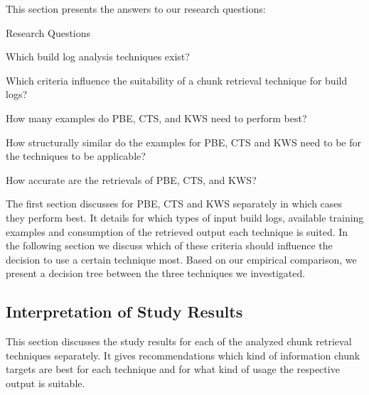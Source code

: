 This section presents the answers to our research questions:
\begin{simplebox}{Research Questions}
\begin{itemize}
  \item[\textbf{RQ1:}] Which build log analysis techniques exist?
  \item[\textbf{RQ2:}] Which criteria influence the suitability of a
  chunk retrieval technique for build logs?

  {\small \item[\textbf{~~ RQ2.1:}] How many examples do PBE, CTS,
  and KWS need to perform best?
  \item[\textbf{~~ RQ2.2:}] How structurally similar do the examples
  for PBE, CTS and KWS need to be for the techniques to be applicable?
  \item[\textbf{~~ RQ2.3:}] How accurate are the retrievals of PBE, CTS,
  and KWS?}
\end{itemize}
\end{simplebox}

The first section discusses for PBE, CTS and KWS separately in which
cases they perform best.
It details for which types of input build
logs, available training examples and consumption of the retrieved
output each technique is suited.
In the following section we discuss
which of these criteria should influence the decision to use a certain
technique most.
Based on our empirical comparison, we present a
decision tree between the three techniques we investigated.

\subsection{Interpretation of Study Results}
This section discusses the study results for each of the analyzed
chunk retrieval techniques separately.
It gives recommendations which
kind of information chunk targets are best for each technique and for
what kind of usage the respective output is suitable.

